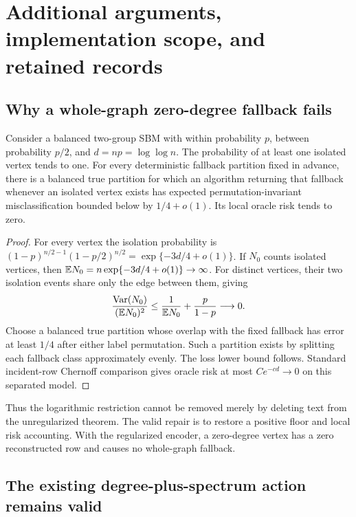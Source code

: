 \section{Additional arguments, implementation scope, and retained records}
\label{sec:scope}
\subsection{Why a whole-graph zero-degree fallback fails}
\begin{proposition}\label{restore:fallback}
Consider a balanced two-group SBM with within probability $p$, between
probability $p/2$, and $d=np=\log\log n$. The probability of at least
one isolated vertex tends to one. For every deterministic fallback
partition fixed in advance, there is a balanced true partition for which
an algorithm returning that fallback whenever an isolated vertex exists
has expected permutation-invariant misclassification bounded below by
$1/4+o(1)$. Its local oracle risk tends to zero.
\end{proposition}

\begin{proof}
For every vertex the isolation probability is
$(1-p)^{n/2-1}(1-p/2)^{n/2}
=\exp\{-3d/4+o(1)\}$. If $N_0$ counts isolated vertices, then
$\mathbb E N_0=n\exp\{-3d/4+o(1)\}\to\infty$. For distinct vertices,
their two isolation events share only the edge between them, giving
\[
 \frac{\operatorname{Var}(N_0)}{(\mathbb E N_0)^2}
 \le \frac1{\mathbb E N_0}+\frac p{1-p}\longrightarrow0.
\]
Choose a balanced true partition whose overlap with the fixed fallback
has error at least $1/4$ after either label permutation. Such a partition
exists by splitting each fallback class approximately evenly. The loss
lower bound follows. Standard incident-row Chernoff comparison gives
oracle risk at most $Ce^{-cd}\to0$ on this separated model.
\end{proof}

Thus the logarithmic restriction cannot be removed merely by deleting
text from the unregularized theorem. The valid repair is to restore a
positive floor and local risk accounting. With the regularized encoder,
a zero-degree vertex has a zero reconstructed row and causes no
whole-graph fallback.

\subsection{The existing degree-plus-spectrum action remains valid}

